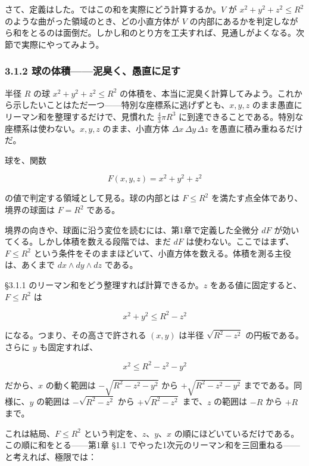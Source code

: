 \documentclass[a4paper,12pt,openany]{book}
\begin{document}
さて、定義はした。ではこの和を実際にどう計算するか。\(V\) が
\(x^2+y^2+z^2 \le R^2\) のような曲がった領域のとき、どの小直方体が \(V\)
の内部にあるかを判定しながら和をとるのは面倒だ。しかし和のとり方を工夫すれば、見通しがよくなる。次節で実際にやってみよう。

\hypertarget{ux7403ux306eux4f53ux7a4dux6ce5ux81edux304fux611aux76f4ux306bux8db3ux3059}{%
\subsubsection{3.1.2
球の体積——泥臭く、愚直に足す}\label{ux7403ux306eux4f53ux7a4dux6ce5ux81edux304fux611aux76f4ux306bux8db3ux3059}}

半径 \(R\) の球 \(x^2 + y^2 + z^2 \le R^2\)
の体積を、本当に泥臭く計算してみよう。これから示したいことはただ一つ——特別な座標系に逃げずとも、\(x, y, z\)
のまま愚直にリーマン和を整理するだけで、見慣れた \(\frac{4}{3}\pi R^3\)
に到達できることである。特別な座標系は使わない。\(x, y, z\)
のまま、小直方体 \(\Delta x\,\Delta y\,\Delta z\)
を愚直に積み重ねるだけだ。

球を、関数

\[F(x,y,z)=x^2+y^2+z^2\]

の値で判定する領域として見る。球の内部とは \(F\le R^2\)
を満たす点全体であり、境界の球面は \(F=R^2\) である。

境界の向きや、球面に沿う変位を読むには、第1章で定義した全微分 \(dF\)
が効いてくる。しかし体積を数える段階では、まだ \(dF\)
は使わない。ここではまず、\(F\le R^2\)
という条件をそのままほどいて、小直方体を数える。体積を測る主役は、あくまで
\(dx\wedge dy\wedge dz\) である。

§3.1.1 のリーマン和をどう整理すれば計算できるか。\(z\)
をある値に固定すると、\(F\le R^2\) は

\[x^2+y^2\le R^2-z^2\]

になる。つまり、その高さで許される \((x,y)\) は半径 \(\sqrt{R^2-z^2}\)
の円板である。さらに \(y\) も固定すれば、

\[x^2\le R^2-z^2-y^2\]

だから、\(x\) の動く範囲は \(-\sqrt{R^2 - z^2 - y^2}\) から
\(+\sqrt{R^2 - z^2 - y^2}\) までである。同様に、\(y\) の範囲は
\(-\sqrt{R^2 - z^2}\) から \(+\sqrt{R^2 - z^2}\) まで、\(z\) の範囲は
\(-R\) から \(+R\) まで。

これは結局、\(F\le R^2\) という判定を、\(z\)、\(y\)、\(x\)
の順にほどいているだけである。この順に和をとる——第1章 §1.1
でやった1次元のリーマン和を三回重ねる——と考えれば、極限では：
\end{document}
